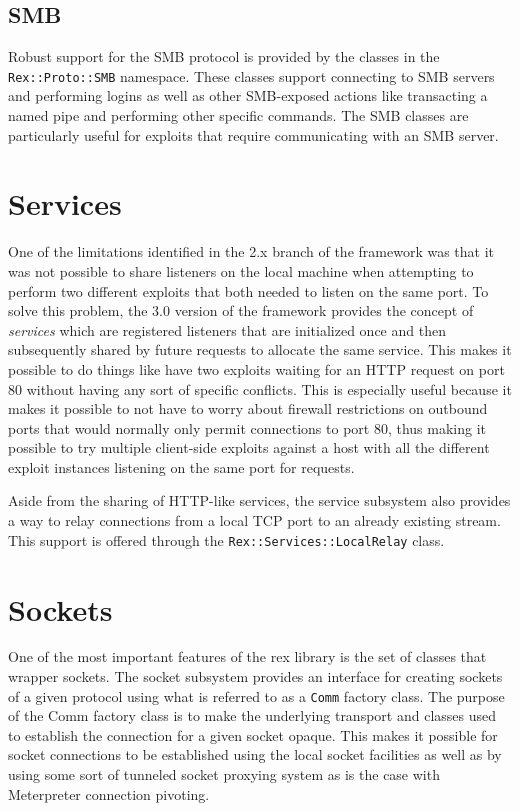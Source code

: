 \documentclass{report}
\begin{document}
        \subsection{SMB}

\par
Robust support for the SMB protocol is provided by the classes in
the \texttt{Rex::Proto::SMB} namespace.  These classes support
connecting to SMB servers and performing logins as well as other
SMB-exposed actions like transacting a named pipe and performing
other specific commands.  The SMB classes are particularly useful
for exploits that require communicating with an SMB server.

    \section{Services}

\par
One of the limitations identified in the 2.x branch of the framework
was that it was not possible to share listeners on the local machine
when attempting to perform two different exploits that both needed
to listen on the same port.  To solve this problem, the 3.0 version
of the framework provides the concept of \textit{services} which are
registered listeners that are initialized once and then subsequently
shared by future requests to allocate the same service.  This makes
it possible to do things like have two exploits waiting for an HTTP
request on port 80 without having any sort of specific conflicts.
This is especially useful because it makes it possible to not have
to worry about firewall restrictions on outbound ports that would
normally only permit connections to port 80, thus making it possible
to try multiple client-side exploits against a host with all the
different exploit instances listening on the same port for requests.

\par
Aside from the sharing of HTTP-like services, the service subsystem
also provides a way to relay connections from a local TCP port to an
already existing stream.  This support is offered through the
\texttt{Rex::Services::LocalRelay} class.

    \section{Sockets}

\par
One of the most important features of the rex library is the set of
classes that wrapper sockets.  The socket subsystem provides an
interface for creating sockets of a given protocol using what is
referred to as a \texttt{Comm} factory class.  The purpose of the
Comm factory class is to make the underlying transport and classes
used to establish the connection for a given socket opaque.  This
makes it possible for socket connections to be established using the
local socket facilities as well as by using some sort of tunneled
socket proxying system as is the case with Meterpreter connection
pivoting.
\end{document}
